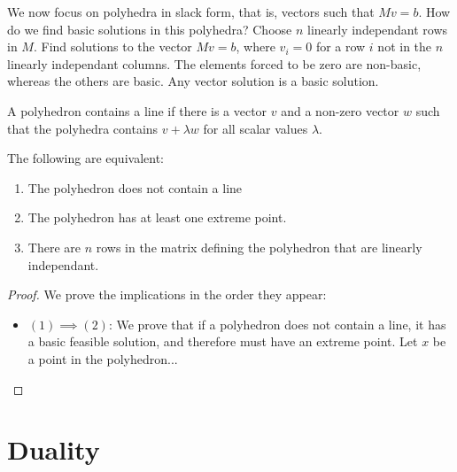     We now focus on polyhedra in slack form, that is, vectors such that $Mv = b$. How do we find basic solutions in this polyhedra? Choose $n$ linearly independant rows in $M$. Find solutions to the vector $Mv = b$, where $v_i = 0$ for a row $i$ not in the $n$ linearly independant columns. The elements forced to be zero are non-basic, whereas the others are basic. Any vector solution is a basic solution.

    \begin{definition}
        A polyhedron contains a line if there is a vector $v$ and a non-zero vector $w$ such that the polyhedra contains $v + \lambda w$ for all scalar values $\lambda$.
    \end{definition}

    \begin{theorem}
        The following are equivalent:

        \begin{enumerate}
            \item The polyhedron does not contain a line
            \item The polyhedron has at least one extreme point.
            \item There are $n$ rows in the matrix defining the polyhedron that are linearly independant.
        \end{enumerate}
    \end{theorem}

    \begin{proof}
        We prove the implications in the order they appear:

        \begin{itemize}
            \item $(1) \implies (2)$: We prove that if a polyhedron does not contain a line, it has a basic feasible solution, and therefore must have an extreme point. Let $x$ be a point in the polyhedron...
        \end{itemize}
    \end{proof}










\chapter{Duality}

